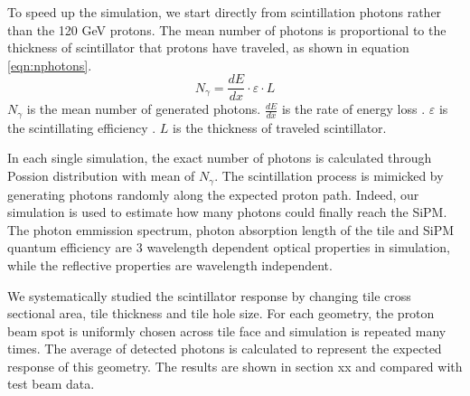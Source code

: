 \documentclass[a4paper,11pt]{article}
\begin{document}
To speed up the simulation, we start directly from scintillation photons rather than the 120 GeV protons.
The mean number of photons is proportional to the thickness of scintillator that protons have traveled, 
as shown in equation \ref{eqn:nphotons}. 
\begin{equation}
\label{eqn:nphotons}
    N_{\gamma}=\frac{d E}{d x} \cdot \varepsilon \cdot L
\end{equation}
$N_{\gamma}$ is the mean number of generated photons.
$\frac{d E}{d x}$ is the rate of energy loss \cite{pdgdata}.
$\varepsilon$ is the scintillating efficiency \cite{scinti_eff}.
$L$ is the thickness of traveled scintillator.


In each single simulation, 
the exact number of photons is calculated through Possion distribution with mean of $N_{\gamma}$.
The scintillation process is mimicked by generating photons randomly along the expected proton path. 
Indeed, our simulation is used to estimate how many photons could finally reach the SiPM.
The photon emmission spectrum, photon absorption length of the tile and SiPM quantum efficiency are 3 wavelength dependent optical properties in simulation,
while the reflective properties are wavelength independent.

We systematically studied the scintillator response 
by changing tile cross sectional area, tile thickness and tile hole size.
For each geometry, the proton beam spot is uniformly chosen across tile face and simulation is repeated many times.
The average of detected photons is calculated to represent the expected response of this geometry.
The results are shown in section xx and compared with test beam data.
\end{document}
